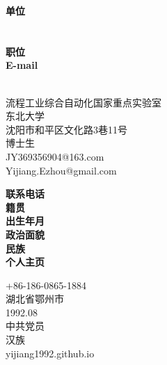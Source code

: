 \documentclass[11pt]{moderncv}
\begin{document}
\begin{CJK*}{UTF8}{gbsn}

 \cnname{\hspace{0.2em}\color{blue}{姜 艺}}
 \maketitle
\vspace{-12mm}

\parbox[t]{2.5cm}{
                \textbf{单位}\\
                \textbf{}\\
                \textbf{}\\
                \textbf{职位}\\
                \textbf{E-mail}\\
                \textbf{}\\
                }
\parbox[t]{7cm}{流程工业综合自动化国家重点实验室\\
                东北大学\\
                沈阳市和平区文化路3巷11号\\
                博士生\\
                JY369356904@163.com\\
                Yijiang.Ezhou@gmail.com\\
                }
\hspace{.3cm}
\parbox[t]{2.5cm}{
               \textbf{联系电话}\\
               \textbf{籍贯}\\
               \textbf{出生年月}\\
               \textbf{政治面貌}\\
               \textbf{民族}\\
               \textbf{个人主页}\\
               }
\parbox[t]{5cm}{
               +86-186-0865-1884\\
               湖北省鄂州市\\
               1992.08\\
               中共党员\\
               汉族\\
               yijiang1992.github.io\\
               }
\vspace{3mm}

\end{CJK*}
\end{document}
